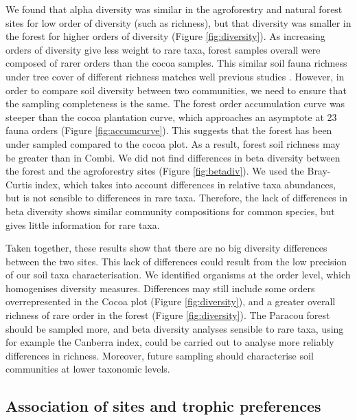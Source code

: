 \documentclass[fleqn,10pt]{ArtEcoFoG} %
\begin{document}
We found that alpha diversity was similar in the agroforestry and natural forest sites for low order of diversity (such as richness), but that diversity was smaller in the forest for higher orders of diversity (Figure \ref{fig:diversity}). As increasing orders of diversity give less weight to rare taxa, forest samples overall were composed of rarer orders than the cocoa samples. This similar soil fauna richness under tree cover of different richness matches well previous studies \citep{korboulewsky_how_2016, rousseau_shade_2021}. However, in order to compare soil diversity between two communities, we need to ensure that the sampling completeness is the same. The forest order accumulation curve was steeper than the cocoa plantation curve, which approaches an asymptote at 23 fauna orders (Figure \ref{fig:accumcurve}). This suggests that the forest has been under sampled compared to the cocoa plot. As a result, forest soil richness may be greater than in Combi. We did not find differences in beta diversity between the forest and the agroforestry sites (Figure \ref{fig:betadiv}). We used the Bray-Curtis index, which takes into account differences in relative taxa abundances, but is not sensible to differences in rare taxa. Therefore, the lack of differences in beta diversity shows similar community compositions for common species, but gives little information for rare taxa.

Taken together, these results show that there are no big diversity differences between the two sites. This lack of differences could result from the low precision of our soil taxa characterisation. We identified organisms at the order level, which homogenises diversity measures. Differences may still include some orders overrepresented in the Cocoa plot (Figure \ref{fig:diversity}), and a greater overall richness of rare order in the forest (Figure \ref{fig:diversity}). The Paracou forest should be sampled more, and beta diversity analyses sensible to rare taxa, using for example the Canberra index, could be carried out to analyse more reliably differences in richness. Moreover, future sampling should characterise soil communities at lower taxonomic levels.

\subsection{Association of sites and trophic preferences}\label{association-of-sites-and-trophic-preferences}
\end{document}
